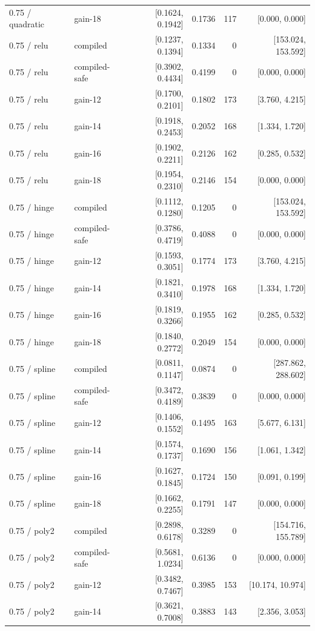\begin{longtable}{@{}llrrrr@{}}
0.75 / quadratic & gain-18 & [0.1624, 0.1942] & 0.1736 & 117 & [0.000, 0.000]\\
0.75 / relu & compiled & [0.1237, 0.1394] & 0.1334 & 0 & [153.024, 153.592]\\
0.75 / relu & compiled-safe & [0.3902, 0.4434] & 0.4199 & 0 & [0.000, 0.000]\\
0.75 / relu & gain-12 & [0.1700, 0.2101] & 0.1802 & 173 & [3.760, 4.215]\\
0.75 / relu & gain-14 & [0.1918, 0.2453] & 0.2052 & 168 & [1.334, 1.720]\\
0.75 / relu & gain-16 & [0.1902, 0.2211] & 0.2126 & 162 & [0.285, 0.532]\\
0.75 / relu & gain-18 & [0.1954, 0.2310] & 0.2146 & 154 & [0.000, 0.000]\\
0.75 / hinge & compiled & [0.1112, 0.1280] & 0.1205 & 0 & [153.024, 153.592]\\
0.75 / hinge & compiled-safe & [0.3786, 0.4719] & 0.4088 & 0 & [0.000, 0.000]\\
0.75 / hinge & gain-12 & [0.1593, 0.3051] & 0.1774 & 173 & [3.760, 4.215]\\
0.75 / hinge & gain-14 & [0.1821, 0.3410] & 0.1978 & 168 & [1.334, 1.720]\\
0.75 / hinge & gain-16 & [0.1819, 0.3266] & 0.1955 & 162 & [0.285, 0.532]\\
0.75 / hinge & gain-18 & [0.1840, 0.2772] & 0.2049 & 154 & [0.000, 0.000]\\
0.75 / spline & compiled & [0.0811, 0.1147] & 0.0874 & 0 & [287.862, 288.602]\\
0.75 / spline & compiled-safe & [0.3472, 0.4189] & 0.3839 & 0 & [0.000, 0.000]\\
0.75 / spline & gain-12 & [0.1406, 0.1552] & 0.1495 & 163 & [5.677, 6.131]\\
0.75 / spline & gain-14 & [0.1574, 0.1737] & 0.1690 & 156 & [1.061, 1.342]\\
0.75 / spline & gain-16 & [0.1627, 0.1845] & 0.1724 & 150 & [0.091, 0.199]\\
0.75 / spline & gain-18 & [0.1662, 0.2255] & 0.1791 & 147 & [0.000, 0.000]\\
0.75 / poly2 & compiled & [0.2898, 0.6178] & 0.3289 & 0 & [154.716, 155.789]\\
0.75 / poly2 & compiled-safe & [0.5681, 1.0234] & 0.6136 & 0 & [0.000, 0.000]\\
0.75 / poly2 & gain-12 & [0.3482, 0.7467] & 0.3985 & 153 & [10.174, 10.974]\\
0.75 / poly2 & gain-14 & [0.3621, 0.7008] & 0.3883 & 143 & [2.356, 3.053]\\

\end{longtable}
